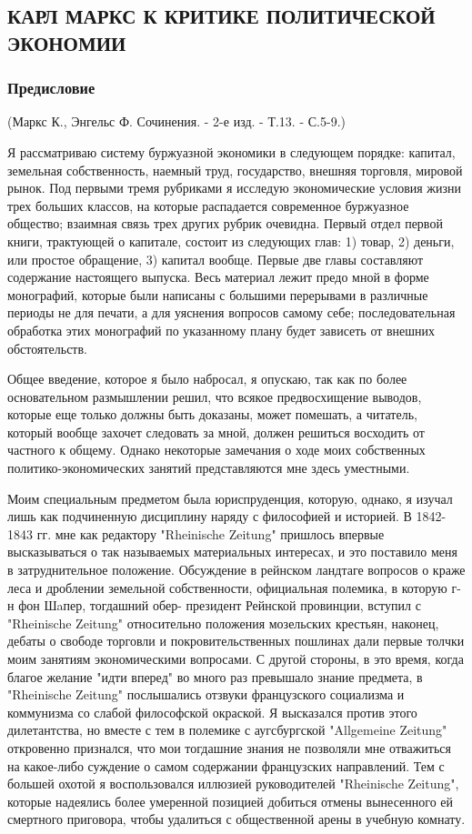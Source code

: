 \documentclass[12pt]{article}
\newcommand{\parnum}{(\arabic{parcount})}
\newcounter{parcount}
\newenvironment{parnumbers}{%
  \par%
  \everypar{\noindent \stepcounter{parcount}\marginpar[]{\parnum}}%
}{}
\begin{document}
\subsection{КАРЛ МАРКС К КРИТИКЕ ПОЛИТИЧЕСКОЙ ЭКОНОМИИ}
\subsubsection*{Предисловие}

(Маркс К., Энгельс Ф. Сочинения. - 2-е изд. - Т.13. - С.5-9.)

\begin{parnumbers}
    Я рассматриваю систему буржуазной экономики в следующем порядке: капитал, земельная собственность, наемный труд, государство, внешняя торговля, мировой рынок. Под первыми тремя рубриками я исследую экономические условия жизни трех больших классов, на которые распадается современное буржуазное общество; взаимная связь трех других рубрик очевидна. Первый отдел первой книги, трактующей о капитале, состоит из следующих глав: 1) товар, 2) деньги, или простое обращение, 3) капитал вообще. Первые две главы составляют содержание настоящего выпуска. Весь материал лежит предо мной в форме монографий, которые были написаны с большими перерывами в различные периоды не для печати, а для уяснения вопросов самому себе; последовательная обработка этих монографий по указанному плану будет зависеть от внешних обстоятельств.

    Общее введение, которое я было набросал, я опускаю, так как по более основательном размышлении решил, что всякое предвосхищение выводов, которые еще только должны быть доказаны, может помешать, а читатель, который вообще захочет следовать за мной, должен решиться восходить от частного к общему. Однако некоторые замечания о ходе моих собственных политико-экономических занятий представляются мне здесь уместными.

    Моим специальным предметом была юриспруденция, которую, однако, я изучал лишь как подчиненную дисциплину наряду с философией и историей. В 1842-1843 гг. мне как редактору "Rheinische Zeitung" пришлось впервые высказываться о так называемых материальных интересах, и это поставило меня в затруднительное положение. Обсуждение в рейнском ландтаге вопросов о краже леса и дроблении земельной собственности, официальная полемика, в которую г-н фон Шaпер, тогдашний обер- президент Рейнской провинции, вступил с "Rheinische Zeitung" относительно положения мозельских крестьян, наконец, дебаты о свободе торговли и покровительственных пошлинах дали первые толчки моим занятиям экономическими вопросами. С другой стороны, в это время, когда благое желание "идти вперед" во много раз превышало знание предмета, в "Rheinische Zeitung" послышались отзвуки французского социализма и коммунизма со слабой философской окраской. Я высказался против этого дилетантства, но вместе с тем в полемике с аугсбургской "Allgemeine Zeitung" откровенно признался, что мои тогдашние знания не позволяли мне отважиться на какое-либо суждение о самом содержании французских направлений. Тем с большей охотой я воспользовался иллюзией руководителей "Rheinische Zeitung", которые надеялись более умеренной позицией добиться отмены вынесенного ей смертного приговора, чтобы удалиться с общественной арены в учебную комнату.


\end{parnumbers}
\end{document}
